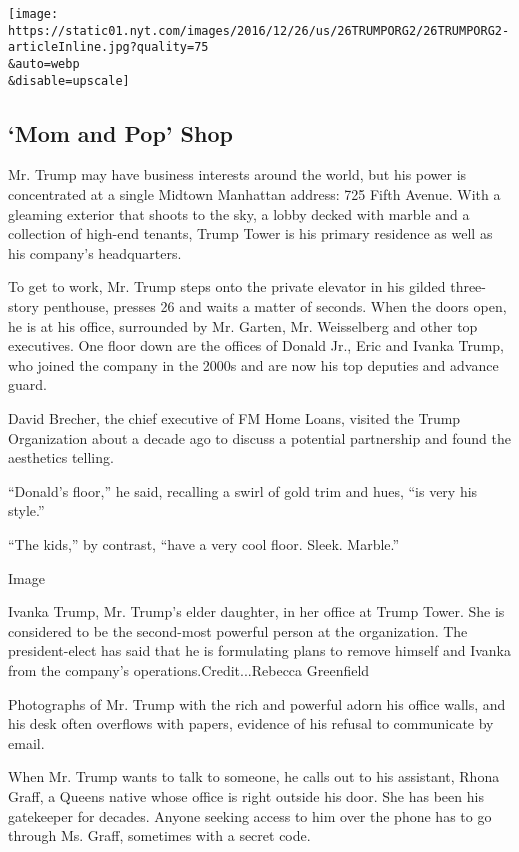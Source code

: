 \texttt{[image: https://static01.nyt.com/images/2016/12/26/us/26TRUMPORG2/26TRUMPORG2-articleInline.jpg?quality=75\\\&auto=webp\\\&disable=upscale]}

\hypertarget{mom-and-pop-shop}{%
\subsection{`Mom and Pop' Shop}\label{mom-and-pop-shop}}

Mr. Trump may have business interests around the world, but his power is
concentrated at a single Midtown Manhattan address: 725 Fifth Avenue.
With a gleaming exterior that shoots to the sky, a lobby decked with
marble and a collection of high-end tenants, Trump Tower is his primary
residence as well as his company's headquarters.

To get to work, Mr. Trump steps onto the private elevator in his gilded
three-story penthouse, presses 26 and waits a matter of seconds. When
the doors open, he is at his office, surrounded by Mr. Garten, Mr.
Weisselberg and other top executives. One floor down are the offices of
Donald Jr., Eric and Ivanka Trump, who joined the company in the 2000s
and are now his top deputies and advance guard.

David Brecher, the chief executive of FM Home Loans, visited the Trump
Organization about a decade ago to discuss a potential partnership and
found the aesthetics telling.

``Donald's floor,'' he said, recalling a swirl of gold trim and hues,
``is very his style.''

``The kids,'' by contrast, ``have a very cool floor. Sleek. Marble.''

Image

Ivanka Trump, Mr. Trump's elder daughter, in her office at Trump Tower.
She is considered to be the second-most powerful person at the
organization. The president-elect has said that he is formulating plans
to remove himself and Ivanka from the company's
operations.Credit...Rebecca Greenfield

Photographs of Mr. Trump with the rich and powerful adorn his office
walls, and his desk often overflows with papers, evidence of his refusal
to communicate by email.

When Mr. Trump wants to talk to someone, he calls out to his assistant,
Rhona Graff, a Queens native whose office is right outside his door. She
has been his gatekeeper for decades. Anyone seeking access to him over
the phone has to go through Ms. Graff, sometimes with a secret code.


